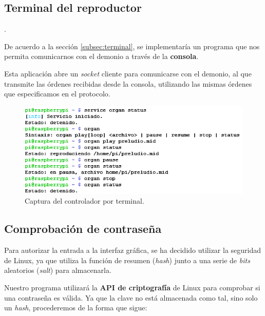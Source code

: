 \subsection{Terminal del reproductor}.

De acuerdo a la sección \ref{subsec:terminal}, se implementaría un programa que nos permita comunicarnos con el demonio a través de la \textbf{consola}.

Esta aplicación abre un \textit{socket} cliente para comunicarse con el demonio, al que transmite las órdenes recibidas desde la consola, utilizando las mismas órdenes que especificamos en el protocolo.

\smallskip

\begin{figure}[H]
	\noindent \begin{centering}
		\includegraphics[width=\linewidth*3/4]{capitulo5/cap_terminal}
		\par\end{centering}
	\smallskip
	\caption{\label{fig:cap_terminal} Captura del controlador por terminal.}
\end{figure} 

\smallskip

\subsection{Comprobación de contraseña}
\label{subsec:aux_login}

Para autorizar la entrada a la interfaz gráfica, se ha decidido utilizar la seguridad de Linux, ya que utiliza la función de resumen (\textit{hash}) junto a una serie de \textit{bits} aleatorios (\textit{salt}) para almacenarla.

Nuestro programa utilizará la \textbf{\acrshort{API} de criptografía} de Linux para comprobar si una contraseña es válida. Ya que la clave no está almacenada como tal, sino solo un \textit{hash}, procederemos de la forma que sigue:

